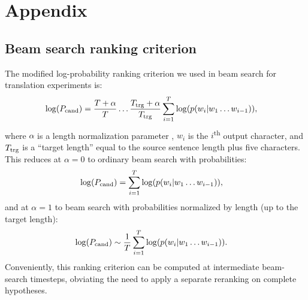 \documentclass{article} \usepackage{iclr2017_conference,times}
\begin{document}



\setcounter{figure}{0}
\renewcommand{\thefigure}{A\arabic{figure}}


\clearpage
\section*{Appendix}

\subsection*{Beam search ranking criterion}
The modified log-probability ranking criterion we used in beam search for translation experiments is:
\begin{align}
\begin{split}\label{length-bonus}
\log(P_{\rm cand})&=\frac{T+\alpha}{T}\hdots\frac{T_{\rm trg}+\alpha}{T_{\rm trg}}\sum_{i=1}^T \log(p(w_i|w_1\hdots w_{i-1})),
\end{split}
\end{align}
where $\alpha$ is a length normalization parameter \citep{Wu2016}, $w_i$ is the $i$\textsuperscript{th} output character, and $T_{\rm trg}$ is a ``target length'' equal to the source sentence length plus five characters. This reduces at $\alpha=0$ to ordinary beam search with probabilities:
\begin{align}
\begin{split}\label{alpha-zero}
\log(P_{\rm cand})&=\sum_{i=1}^T \log(p(w_i|w_1\hdots w_{i-1})),
\end{split}
\end{align}
and at $\alpha=1$ to beam search with probabilities normalized by length (up to the target length): 
\begin{align}
\begin{split}\label{alpha-one}
\log(P_{\rm cand})&\sim \frac{1}{T}\sum_{i=1}^T \log(p(w_i|w_1\hdots w_{i-1})).
\end{split}
\end{align}
Conveniently, this ranking criterion can be computed at intermediate beam-search timesteps, obviating the need to apply a separate reranking on complete hypotheses.
\end{document}
